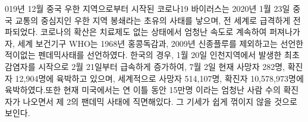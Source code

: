 \documentclass[10pt,journal,compsoc]{IEEEtran}
\begin{document}
%
\IEEEpeerreviewmaketitle







% 
% 
% 
% 
019년 12월 중국 우한 지역으로부터 시작된 코로나19 바이러스는 2020년 1월 23일 중국 교통의 중심지인 우한 지역 봉쇄라는 초유의 사태를 낳으며, 전 세계로 급격하게 전파되었다. 코로나의 확산은 치료제도 없는 상태에서 엄청난 속도로 계속하여 퍼져나가자, 세계 보건기구 WHO는 1968년 홍콩독감과, 2009년 신종플루를 제외하고는 선언한 적이없는 펜데믹사태를 선언하였다. 한국의 경우, 1월 20일 인천지역에서 발생한 최초 감염자를 시작으로 2월 21일부터 급속하게 증가하여, 7월 2일 현재 사망자 282명, 확진자 12,904명에 육박하고 있으며, 세계적으로 사망자 514,107명, 확진자 10,578,973명에 육박하였다.또한 현재 미국에서는 연 이틀 동안 15만명 이라는 엄청난 사람 수의 확진자가 나오면서 제 2의 팬데믹 사태에 직면해있다. 그 기세가 쉽게 꺾이지 않을 것으로 보인다.
\end{document}
